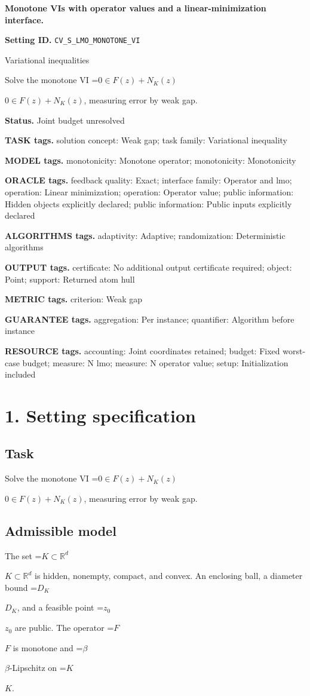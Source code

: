 \documentclass[10pt,a4paper]{article}
\newcommand{\AtlasMath}[1]{\par\begingroup\centering\setbox0=\hbox{$\displaystyle #1$}\ifdim\wd0>1.4\linewidth\typeout{ATLAS WIDE FORMULA: \the\wd0}\fi\ifdim\wd0>\linewidth\resizebox{\linewidth}{!}{\box0}\else\box0\fi\par\endgroup}
\newcommand{\AtlasInlineMath}[1]{\begingroup\setbox0=\hbox{$#1$}\ifdim\wd0>.4\linewidth\endgroup\AtlasMath{#1}\else\endgroup$#1$\fi}
\begin{document}
\raggedright

{\LARGE\bfseries\sffamily\color{AtlasNavy} Monotone VIs with operator values and a linear-minimization interface.\par}\vspace{5pt}
\textbf{Setting ID.} \texttt{CV\_\allowbreak{}\allowbreak{}S\_\allowbreak{}\allowbreak{}LMO\_\allowbreak{}\allowbreak{}MONOTONE\_\allowbreak{}\allowbreak{}VI}

Variational inequalities

Solve the monotone VI \AtlasInlineMath{0\in F(z)+N_K(z)}, measuring error by weak gap.

\textbf{Status.} Joint budget unresolved

\textbf{TASK tags.} solution concept: Weak gap; task family: Variational inequality

\textbf{MODEL tags.} monotonicity: Monotone operator; monotonicity: Monotonicity

\textbf{ORACLE tags.} feedback quality: Exact; interface family: Operator and lmo; operation: Linear minimization; operation: Operator value; public information: Hidden objects explicitly declared; public information: Public inputs explicitly declared

\textbf{ALGORITHMS tags.} adaptivity: Adaptive; randomization: Deterministic algorithms

\textbf{OUTPUT tags.} certificate: No additional output certificate required; object: Point; support: Returned atom hull

\textbf{METRIC tags.} criterion: Weak gap

\textbf{GUARANTEE tags.} aggregation: Per instance; quantifier: Algorithm before instance

\textbf{RESOURCE tags.} accounting: Joint coordinates retained; budget: Fixed worst-case budget; measure: N lmo; measure: N operator value; setup: Initialization included

\section{1. Setting specification}
\subsection{Task}
Solve the monotone VI \AtlasInlineMath{0\in F(z)+N_K(z)}, measuring error by weak gap.

\subsection{Admissible model}
The set \AtlasInlineMath{K\subset\mathbb{R}^d} is hidden, nonempty, compact, and convex. An enclosing ball, a diameter bound \AtlasInlineMath{D_K}, and a feasible point \AtlasInlineMath{z_0} are public. The operator \AtlasInlineMath{F} is monotone and \AtlasInlineMath{\beta}-Lipschitz on \AtlasInlineMath{K}.
\end{document}

